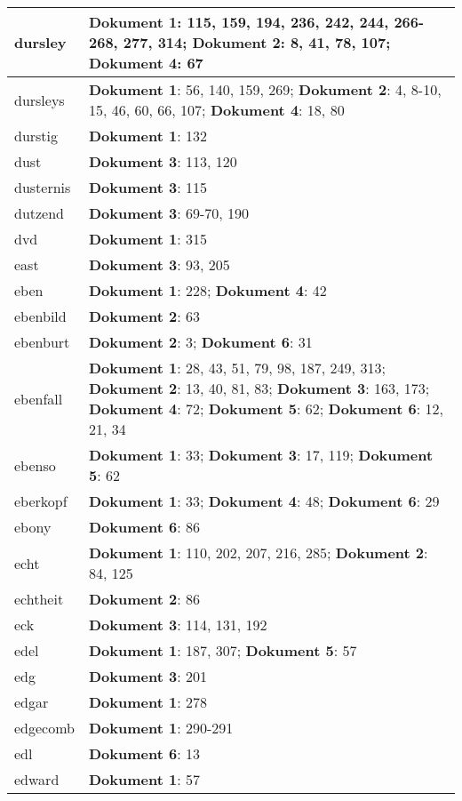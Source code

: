 \documentclass[a5paper]{article}
\begin{document}
\begin{longtable}[l]{|l|p{3in}|}
\hline
dursley & \textbf{Dokument 1}: 115, 159, 194, 236, 242, 244, 266-268, 277, 314; \textbf{Dokument 2}: 8, 41, 78, 107; \textbf{Dokument 4}: 67 \\
\hline
dursleys & \textbf{Dokument 1}: 56, 140, 159, 269; \textbf{Dokument 2}: 4, 8-10, 15, 46, 60, 66, 107; \textbf{Dokument 4}: 18, 80 \\
\hline
durstig & \textbf{Dokument 1}: 132 \\
\hline
dust & \textbf{Dokument 3}: 113, 120 \\
\hline
dusternis & \textbf{Dokument 3}: 115 \\
\hline
dutzend & \textbf{Dokument 3}: 69-70, 190 \\
\hline
dvd & \textbf{Dokument 1}: 315 \\
\hline
east & \textbf{Dokument 3}: 93, 205 \\
\hline
eben & \textbf{Dokument 1}: 228; \textbf{Dokument 4}: 42 \\
\hline
ebenbild & \textbf{Dokument 2}: 63 \\
\hline
ebenburt & \textbf{Dokument 2}: 3; \textbf{Dokument 6}: 31 \\
\hline
ebenfall & \textbf{Dokument 1}: 28, 43, 51, 79, 98, 187, 249, 313; \textbf{Dokument 2}: 13, 40, 81, 83; \textbf{Dokument 3}: 163, 173; \textbf{Dokument 4}: 72; \textbf{Dokument 5}: 62; \textbf{Dokument 6}: 12, 21, 34 \\
\hline
ebenso & \textbf{Dokument 1}: 33; \textbf{Dokument 3}: 17, 119; \textbf{Dokument 5}: 62 \\
\hline
eberkopf & \textbf{Dokument 1}: 33; \textbf{Dokument 4}: 48; \textbf{Dokument 6}: 29 \\
\hline
ebony & \textbf{Dokument 6}: 86 \\
\hline
echt & \textbf{Dokument 1}: 110, 202, 207, 216, 285; \textbf{Dokument 2}: 84, 125 \\
\hline
echtheit & \textbf{Dokument 2}: 86 \\
\hline
eck & \textbf{Dokument 3}: 114, 131, 192 \\
\hline
edel & \textbf{Dokument 1}: 187, 307; \textbf{Dokument 5}: 57 \\
\hline
edg & \textbf{Dokument 3}: 201 \\
\hline
edgar & \textbf{Dokument 1}: 278 \\
\hline
edgecomb & \textbf{Dokument 1}: 290-291 \\
\hline
edl & \textbf{Dokument 6}: 13 \\
\hline
edward & \textbf{Dokument 1}: 57 \\

\end{longtable}
\end{document}
